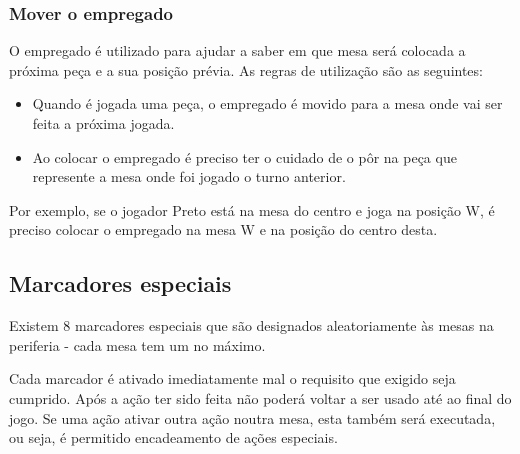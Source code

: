 \documentclass[a4paper]{article}
\begin{document}
\subsubsection{Mover o empregado}
O empregado é utilizado para ajudar a saber em que mesa será colocada a próxima peça e a sua posição prévia. As regras de utilização são as seguintes:
\begin{itemize}
\item Quando é jogada uma peça, o empregado é movido para a mesa onde vai ser feita a próxima jogada.
\item Ao colocar o empregado é preciso ter o cuidado de o pôr na peça que represente a mesa onde foi jogado o turno anterior.
\end{itemize}
Por exemplo, se o jogador Preto está na mesa do centro e joga na posição W, é preciso colocar o empregado na mesa W e na posição do centro desta.

\subsection{Marcadores especiais}

Existem 8 marcadores especiais que são designados aleatoriamente às mesas na periferia - cada mesa tem um no máximo. 

Cada marcador é ativado imediatamente mal o requisito que exigido seja cumprido. Após a ação ter sido feita não poderá voltar a ser usado até ao final do jogo. Se uma ação ativar outra ação noutra mesa, esta também será executada, ou seja, é permitido encadeamento de ações especiais.
\end{document}

